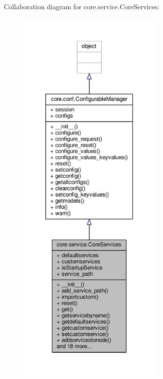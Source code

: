 Collaboration diagram for core.\+service.\+Core\+Services\+:
\nopagebreak
\begin{figure}[H]
\begin{center}
\leavevmode
\includegraphics[height=550pt]{classcore_1_1service_1_1_core_services__coll__graph}
\end{center}
\end{figure}
